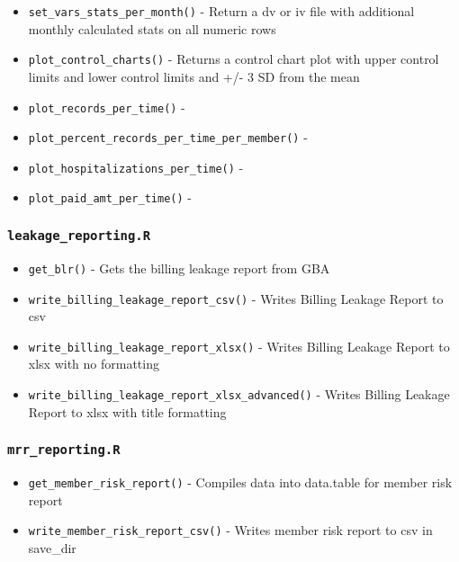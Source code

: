 \documentclass[
]{book}
\providecommand{\tightlist}{%
  \setlength{\itemsep}{0pt}\setlength{\parskip}{0pt}}
\begin{document}
\begin{itemize}
\tightlist
\item
  \texttt{set\_vars\_stats\_per\_month()} - Return a dv or iv file with additional monthly calculated stats on all numeric rows
\item
  \texttt{plot\_control\_charts()} - Returns a control chart plot with upper control limits and lower control limits and +/- 3 SD from the mean
\item
  \texttt{plot\_records\_per\_time()} -
\item
  \texttt{plot\_percent\_records\_per\_time\_per\_member()} -
\item
  \texttt{plot\_hospitalizations\_per\_time()} -
\item
  \texttt{plot\_paid\_amt\_per\_time()} -
\end{itemize}

\hypertarget{leakage_reporting.r}{%
\subsubsection{\texorpdfstring{\texttt{leakage\_reporting.R}}{leakage\_reporting.R}}\label{leakage_reporting.r}}

\begin{itemize}
\tightlist
\item
  \texttt{get\_blr()} - Gets the billing leakage report from GBA
\item
  \texttt{write\_billing\_leakage\_report\_csv()} - Writes Billing Leakage Report to csv
\item
  \texttt{write\_billing\_leakage\_report\_xlsx()} - Writes Billing Leakage Report to xlsx with no formatting
\item
  \texttt{write\_billing\_leakage\_report\_xlsx\_advanced()} - Writes Billing Leakage Report to xlsx with title formatting
\end{itemize}

\hypertarget{mrr_reporting.r}{%
\subsubsection{\texorpdfstring{\texttt{mrr\_reporting.R}}{mrr\_reporting.R}}\label{mrr_reporting.r}}

\begin{itemize}
\tightlist
\item
  \texttt{get\_member\_risk\_report()} - Compiles data into data.table for member risk report
\item
  \texttt{write\_member\_risk\_report\_csv()} - Writes member risk report to csv in save\_dir
\end{itemize}
\end{document}

